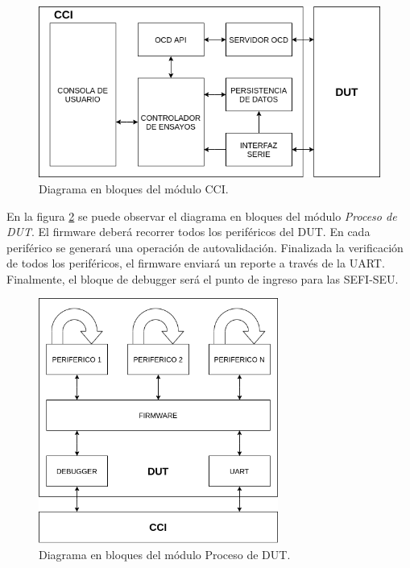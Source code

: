 \documentclass[
11pt, %
codirector, %
]{charter}
\begin{document}
\begin{figure}[h!]
	\centering
	\includegraphics[width=\textwidth]{./Figuras/CCIbloques.png}
	\caption{Diagrama en bloques del módulo CCI.}
	\label{fig:CCIbloques}
\end{figure}

En la figura \ref{fig:DUTbloques} se puede observar el diagrama en bloques del módulo \emph{Proceso de DUT}.
El firmware deberá recorrer todos los periféricos del DUT.
En cada periférico se generará una operación de autovalidación.
Finalizada la verificación de todos los periféricos, el firmware enviará un reporte a través de la UART.
Finalmente, el bloque de debugger será el punto de ingreso para las SEFI-SEU.

\begin{figure}[h!]
	\centering
	\includegraphics[width=0.7\textwidth]{./Figuras/DUTbloques.png}
	\caption{Diagrama en bloques del módulo Proceso de DUT.}
	\label{fig:DUTbloques}
\end{figure}
\end{document}
